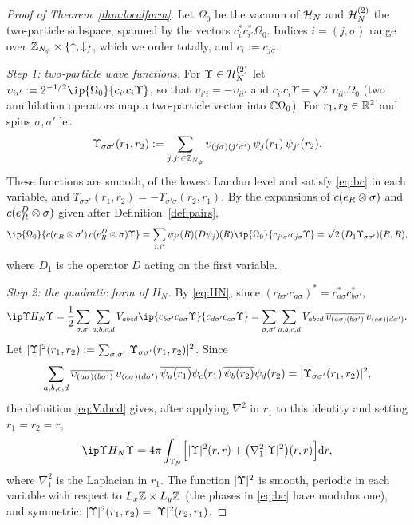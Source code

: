 \begin{proof}[Proof of Theorem~\ref{thm:localform}]
Let $\Omega_0$ be the vacuum of $\mathcal{H}_N$ and $\mathcal{H}_N^{(2)}$ the two-particle subspace, spanned by the vectors
$c_i^*c_{i'}^*\Omega_0$. Indices $i=(j,\sigma)$ range over $\mathbb{Z}_{N_{\phi}}\times\{{\uparrow},{\downarrow}\}$, which we order totally, and
$c_i:=c_{j\sigma}$.

\emph{Step 1: two-particle wave functions.} For $\Upsilon\in\mathcal{H}_N^{(2)}$ let $\upsilon_{ii'}:=2^{-1/2}\ip{\Omega_0}{c_{i'}c_i\Upsilon}$,
so that $\upsilon_{i'i}=-\upsilon_{ii'}$ and $c_{i'}c_i\Upsilon=\sqrt2\,\upsilon_{ii'}\Omega_0$ (two annihilation operators map a
two-particle vector into $\mathbb{C}\Omega_0$). For $r_1,r_2\in\mathbb{R}^2$ and spins $\sigma,\sigma'$ let
\[
\Upsilon_{\sigma\sigma'}(r_1,r_2):=\sum_{j,j'\in\mathbb{Z}_{N_{\phi}}}\upsilon_{(j\sigma)(j'\sigma')}\,\psi_j(r_1)\,\psi_{j'}(r_2).
\]
These functions are smooth, of the lowest Landau level and satisfy \eqref{eq:bc} in each variable, and
$\Upsilon_{\sigma\sigma'}(r_1,r_2)=-\Upsilon_{\sigma'\sigma}(r_2,r_1)$. By the expansions of $c(e_{R}\otimes\sigma)$ and
$c(e^{D}_{R}\otimes\sigma)$ given after Definition~\ref{def:pairs},
\begin{equation}\label{eq:pairamp}
\ip{\Omega_0}{c(\ev R\otimes\sigma')\,c(\evD R\otimes\sigma)\Upsilon}
=\sum_{j,j'}\psi_{j'}(R)(D\psi_j)(R)\ip{\Omega_0}{c_{j'\sigma'}c_{j\sigma}\Upsilon}=\sqrt2\,(D_1\Upsilon_{\sigma\sigma'})(R,R),
\end{equation}
where $D_1$ is the operator $D$ acting on the first variable.

\emph{Step 2: the quadratic form of $H_N$.} By \eqref{eq:HN}, since $(c_{b\sigma'}c_{a\sigma})^*=c^*_{a\sigma}c^*_{b\sigma'}$,
\[
\ip\Upsilon{H_N\Upsilon}=\frac12\sum_{\sigma,\sigma'}\sum_{a,b,c,d}V_{abcd}\ip{c_{b\sigma'}c_{a\sigma}\Upsilon}{c_{d\sigma'}c_{c\sigma}\Upsilon}
=\sum_{\sigma,\sigma'}\sum_{a,b,c,d}V_{abcd}\,\overline{\upsilon_{(a\sigma)(b\sigma')}}\,\upsilon_{(c\sigma)(d\sigma')}.
\]
Let $\lvert\Upsilon\rvert^2(r_1,r_2):=\sum_{\sigma,\sigma'}\lvert\Upsilon_{\sigma\sigma'}(r_1,r_2)\rvert^2$. Since
\[
\sum_{a,b,c,d}\overline{\upsilon_{(a\sigma)(b\sigma')}}\,\upsilon_{(c\sigma)(d\sigma')}\,\overline{\psi_a(r_1)}\psi_c(r_1)\,\overline{\psi_b(r_2)}\psi_d(r_2)=\lvert\Upsilon_{\sigma\sigma'}(r_1,r_2)\rvert^2,
\]
the definition \eqref{eq:Vabcd} gives, after applying $\nabla^2$ in $r_1$ to this identity and setting $r_1=r_2=r$,
\[
\ip\Upsilon{H_N\Upsilon}=4\pi\int_{\Tor_N}\Bigl[\abs\Upsilon^2(r,r)+\bigl(\nabla_1^2\abs\Upsilon^2\bigr)(r,r)\Bigr]\dd r,
\]
where $\nabla_1^2$ is the Laplacian in $r_1$. The function $\lvert\Upsilon\rvert^2$ is smooth, periodic in each variable with
respect to $L_x\mathbb{Z}\times L_y\mathbb{Z}$ (the phases in \eqref{eq:bc} have modulus one), and symmetric:
$\lvert\Upsilon\rvert^2(r_1,r_2)=\lvert\Upsilon\rvert^2(r_2,r_1)$.


\end{proof}

